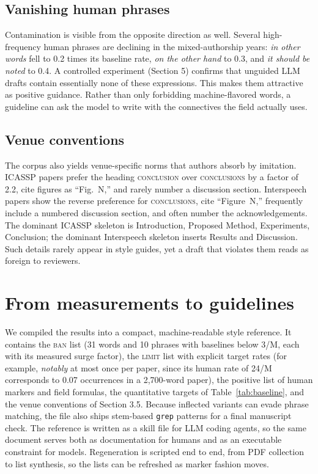 \documentclass[a4paper,10pt,twocolumn]{article}
\begin{document}
\subsection{Vanishing human phrases}

Contamination is visible from the opposite direction as well. Several high-frequency human phrases are declining in the mixed-authorship years: \emph{in other words} fell to 0.2 times its baseline rate, \emph{on the other hand} to 0.3, and \emph{it should be noted} to 0.4. A controlled experiment (Section 5) confirms that unguided LLM drafts contain essentially none of these expressions. This makes them attractive as positive guidance. Rather than only forbidding machine-flavored words, a guideline can ask the model to write with the connectives the field actually uses.

\subsection{Venue conventions}

The corpus also yields venue-specific norms that authors absorb by imitation. ICASSP papers prefer the heading \textsc{conclusion} over \textsc{conclusions} by a factor of 2.2, cite figures as ``Fig.~N,'' and rarely number a discussion section. Interspeech papers show the reverse preference for \textsc{conclusions}, cite ``Figure~N,'' frequently include a numbered discussion section, and often number the acknowledgements. The dominant ICASSP skeleton is Introduction, Proposed Method, Experiments, Conclusion; the dominant Interspeech skeleton inserts Results and Discussion. Such details rarely appear in style guides, yet a draft that violates them reads as foreign to reviewers.

\section{From measurements to guidelines}

We compiled the results into a compact, machine-readable style reference. It contains the \textsc{ban} list (31 words and 10 phrases with baselines below 3/M, each with its measured surge factor), the \textsc{limit} list with explicit target rates (for example, \emph{notably} at most once per paper, since its human rate of 24/M corresponds to 0.07 occurrences in a 2{,}700-word paper), the positive list of human markers and field formulas, the quantitative targets of Table~\ref{tab:baseline}, and the venue conventions of Section 3.5. Because inflected variants can evade phrase matching, the file also ships stem-based \texttt{grep} patterns for a final manuscript check. The reference is written as a skill file for LLM coding agents, so the same document serves both as documentation for humans and as an executable constraint for models. Regeneration is scripted end to end, from PDF collection to list synthesis, so the lists can be refreshed as marker fashion moves.
\end{document}
